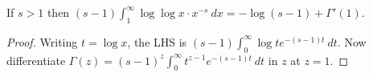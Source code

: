 \begin{sublemma}
\label{log-zeta-eq-3}
\leanok
If $s > 1$ then $(s-1) \int_1^\infty \log \log x \cdot x^{-s}\ dx = -\log (s-1) + \Gamma'(1)$.
\end{sublemma}
\begin{proof}
\leanok
Writing $t = \log x$, the LHS is $(s-1) \int_0^\infty \log t e^{-(s-1) t}\ dt$.  Now differentiate $\Gamma(z) = (s-1)^z \int_0^\infty t^{z-1} e^{-(s-1)t}\ dt$ in $z$ at $z=1$.
\end{proof}
